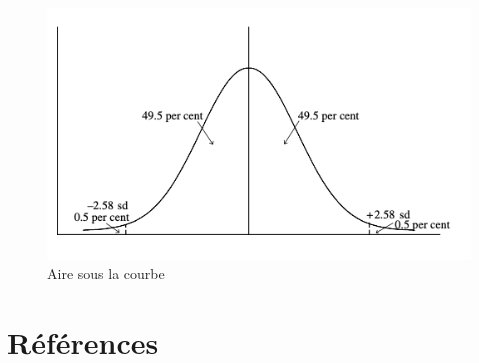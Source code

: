 \documentclass[
]{book}
\begin{document}
\begin{figure}
\centering
\includegraphics{images/normal.png}
\caption{Aire sous la courbe}
\end{figure}

\hypertarget{ruxe9fuxe9rences}{%
\chapter*{Références}\label{ruxe9fuxe9rences}}

  
\end{document}
